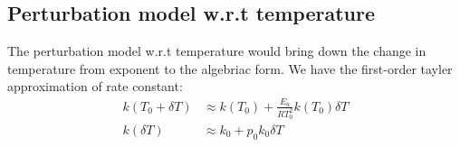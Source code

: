 \subsection{Perturbation model w.r.t temperature}
The perturbation model w.r.t temperature would bring down the change in
temperature from exponent to the algebriac form. We have the first-order tayler
approximation of rate constant:
\begin{align*}
    k(T_0 + \delta T) &\approx k(T_0) + \frac{E_a}{RT_0^2} k(T_0) \delta T\\
    k(\delta T) &\approx k_0 + p_0k_0 \delta T
\end{align*}

